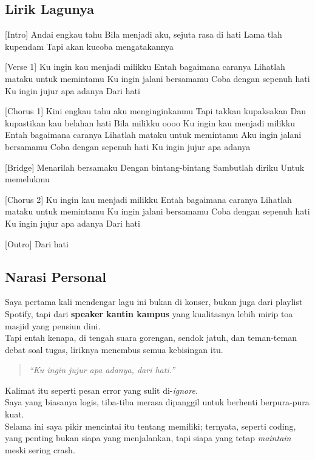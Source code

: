 \documentclass[
  letterpaper,
  DIV=11,
  numbers=noendperiod]{scrreprt}
\begin{document}
\subsection{Lirik Lagunya}\label{lirik-lagunya}

{[}Intro{]} Andai engkau tahu Bila menjadi aku, sejuta rasa di hati Lama
tlah kupendam Tapi akan kucoba mengatakannya

{[}Verse 1{]} Ku ingin kau menjadi milikku Entah bagaimana caranya
Lihatlah mataku untuk memintamu Ku ingin jalani bersamamu Coba dengan
sepenuh hati Ku ingin jujur apa adanya Dari hati

{[}Chorus 1{]} Kini engkau tahu aku menginginkanmu Tapi takkan
kupaksakan Dan kupastikan kau belahan hati Bila milikku oooo Ku ingin
kau menjadi milikku Entah bagaimana caranya Lihatlah mataku untuk
memintamu Aku ingin jalani bersamamu Coba dengan sepenuh hati Ku ingin
jujur apa adanya

{[}Bridge{]} Menarilah bersamaku Dengan bintang-bintang Sambutlah diriku
Untuk memelukmu

{[}Chorus 2{]} Ku ingin kau menjadi milikku Entah bagaimana caranya
Lihatlah mataku untuk memintamu Ku ingin jalani bersamamu Coba dengan
sepenuh hati Ku ingin jujur apa adanya Dari hati

{[}Outro{]} Dari hati

\subsection{Narasi Personal}\label{narasi-personal}

Saya pertama kali mendengar lagu ini bukan di konser, bukan juga dari
playlist Spotify, tapi dari \textbf{speaker kantin kampus} yang
kualitasnya lebih mirip toa masjid yang pensiun dini.\\
Tapi entah kenapa, di tengah suara gorengan, sendok jatuh, dan
teman-teman debat soal tugas, liriknya menembus semua kebisingan itu.

\begin{quote}
\emph{``Ku ingin jujur apa adanya, dari hati.''}
\end{quote}

Kalimat itu seperti pesan error yang sulit di-\emph{ignore}.\\
Saya yang biasanya logis, tiba-tiba merasa dipanggil untuk berhenti
berpura-pura kuat.\\
Selama ini saya pikir mencintai itu tentang memiliki; ternyata, seperti
coding, yang penting bukan siapa yang menjalankan, tapi siapa yang tetap
\emph{maintain} meski sering crash.
\end{document}
